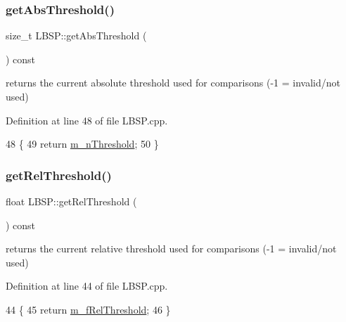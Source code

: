 \subsubsection{\texorpdfstring{get\+Abs\+Threshold()}{getAbsThreshold()}}
{\footnotesize\ttfamily size\+\_\+t L\+B\+S\+P\+::get\+Abs\+Threshold (\begin{DoxyParamCaption}{ }\end{DoxyParamCaption}) const\hspace{0.3cm}{\ttfamily [virtual]}}



returns the current absolute threshold used for comparisons (-\/1 = invalid/not used) 



Definition at line 48 of file L\+B\+S\+P.\+cpp.


\begin{DoxyCode}
48                                    \{
49     \textcolor{keywordflow}{return} \mbox{\hyperlink{class_l_b_s_p_aa1c90eb308a5ff277df09c4da186693a}{m\_nThreshold}};
50 \}
\end{DoxyCode}
\mbox{\label{class_l_b_s_p_acf999adf45d5e425d28b00ace6c928a4}} 
\subsubsection{\texorpdfstring{get\+Rel\+Threshold()}{getRelThreshold()}}
{\footnotesize\ttfamily float L\+B\+S\+P\+::get\+Rel\+Threshold (\begin{DoxyParamCaption}{ }\end{DoxyParamCaption}) const\hspace{0.3cm}{\ttfamily [virtual]}}



returns the current relative threshold used for comparisons (-\/1 = invalid/not used) 



Definition at line 44 of file L\+B\+S\+P.\+cpp.


\begin{DoxyCode}
44                                   \{
45     \textcolor{keywordflow}{return} \mbox{\hyperlink{class_l_b_s_p_a99fbb83c842782bb5621a43efb7580d5}{m\_fRelThreshold}};
46 \}
\end{DoxyCode}
\mbox{\label{class_l_b_s_p_a1f75012723a8990ea7b9f74d3293dbe6}} 
